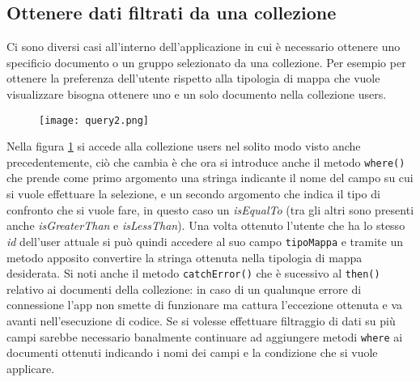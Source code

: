 \subsection{Ottenere dati filtrati da una collezione}
Ci sono diversi casi all'interno dell'applicazione in cui è necessario ottenere
uno specificio documento o un gruppo selezionato da una collezione. Per esempio
per ottenere la preferenza dell'utente rispetto alla tipologia di mappa che
vuole visualizzare bisogna ottenere uno e un solo documento nella collezione
users. \\
\begin{figure}[!h]
    \centering
    \texttt{[image: query2.png]}
    \caption{}
    \label{query2}
\end{figure}
Nella figura \ref{query2} si accede alla collezione users nel solito modo visto
anche precedentemente, ciò che cambia è che ora si introduce anche il metodo
\verb|where()| che prende come primo argomento una stringa indicante il nome del
campo su cui si vuole effettuare la selezione, e un secondo argomento che indica
il tipo di confronto che si vuole fare, in questo caso un \textit{isEqualTo}
(tra gli altri sono presenti anche \textit{isGreaterThan} e
\textit{isLessThan}). Una volta ottenuto l'utente che ha lo stesso \textit{id}
dell'user attuale si può quindi accedere al suo campo \verb|tipoMappa| e
tramite un metodo apposito convertire la stringa ottenuta nella tipologia di
mappa desiderata. Si noti anche il metodo \verb|catchError()| che è sucessivo al
\verb|then()| relativo ai documenti della collezione: in caso di un qualunque errore di
connessione l'app non smette di funzionare ma cattura l'eccezione ottenuta e va
avanti nell'esecuzione di codice. Se si volesse effettuare filtraggio di dati su
più campi sarebbe necessario banalmente continuare ad aggiungere metodi
\verb|where| ai documenti ottenuti indicando i nomi dei campi e la condizione
che si vuole applicare.


